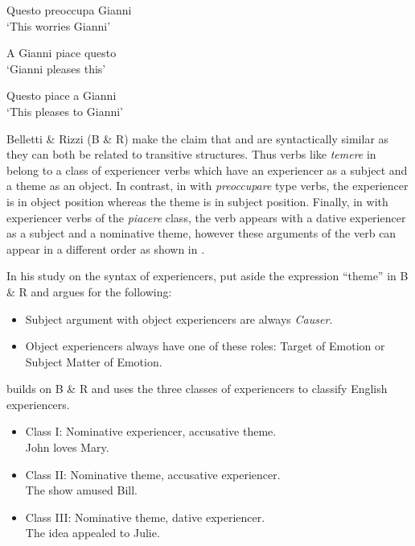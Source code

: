 \documentclass[output=paper]{langscibook}
\begin{document}
\ex \label{ex:tamba:3b}
 Questo preoccupa Gianni\\
\glt `This worries Gianni'

\ex \label{ex:tamba:3c}
 A Gianni piace questo\\
\glt `Gianni pleases this'

\ex \label{ex:tamba:3d}
 Questo piace a Gianni\\
\glt `This pleases to Gianni'
\z
\z 

Belletti \& Rizzi (B \& R) make the claim that  and  are  syntactically similar as they can both be related to transitive structures.  Thus verbs like \textit{temere} in   belong to a class of  experiencer verbs which have an experiencer as a subject and a theme as an object. In contrast, in  with \textit{preoccupare} type verbs, the experiencer is in object position whereas the theme is in subject position.  Finally, in  with experiencer verbs of the \textit{piacere} class, the verb appears with a dative experiencer as a subject and a nominative theme, however these arguments of the verb can appear in a different order as shown in . 

In his study on the syntax of experiencers, \citet{Pesetsky1995} put aside the expression “theme” in B \& R  and argues for the following: 

\begin{itemize}
\item Subject argument with object experiencers are always \textit{Causer.}
\item Object experiencers always have one of these roles: Target of Emotion or Subject Matter of Emotion.
\end{itemize}


\citet[3]{Landau2010} builds on B \& R and uses the three classes of experiencers to classify English experiencers.  

\begin{itemize}
\item Class I: Nominative experiencer, accusative theme.\\
John loves Mary.

\item Class II: Nominative theme, accusative experiencer.\\
The show amused Bill.

\item Class III: Nominative theme, dative experiencer.\\
The idea appealed to Julie.
\end{itemize}
\end{document}

